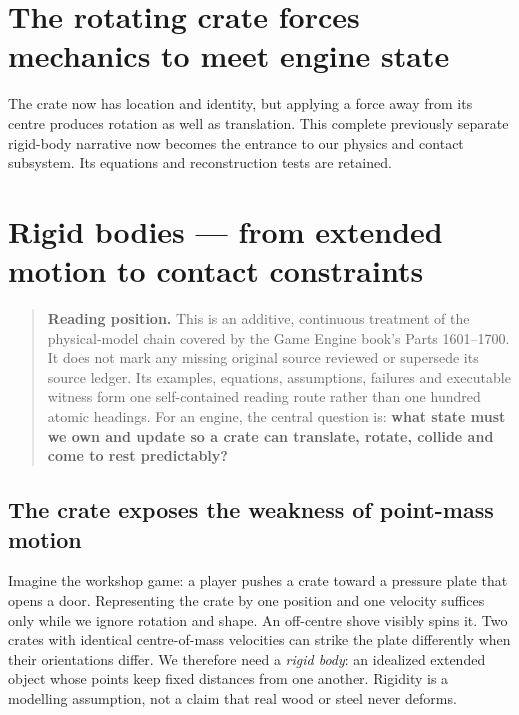\section{The rotating crate forces mechanics to meet engine state}\label{06-engine-ii-ch033-the-rotating-crate-forces-mechanics-to-meet-engine-state}

\hypertarget{06-engine-ii-ch033-the-rotating-crate-forces-mechanics-to-meet-engine-state}{}

The crate now has location and identity, but applying a force away from its centre produces rotation as well as translation. This complete previously separate rigid-body narrative now becomes the entrance to our physics and contact subsystem. Its equations and reconstruction tests are retained.

\section{Rigid bodies --- from extended motion to contact constraints}\label{06-engine-ii-ch033-rigid-bodies-from-extended-motion-to-contact-constraints}

\hypertarget{06-engine-ii-ch033-rigid-bodies-from-extended-motion-to-contact-constraints}{}

\begin{quote}
\textbf{Reading position.} This is an additive, continuous treatment of the physical-model chain covered by the Game Engine book's Parts 1601--1700. It does not mark any missing original source reviewed or supersede its source ledger. Its examples, equations, assumptions, failures and executable witness form one self-contained reading route rather than one hundred atomic headings. For an engine, the central question is: \textbf{what state must we own and update so a crate can translate, rotate, collide and come to rest predictably?}
\end{quote}

\subsection{The crate exposes the weakness of point-mass motion}\label{06-engine-ii-ch033-the-crate-exposes-the-weakness-of-point-mass-motion}

\hypertarget{06-engine-ii-ch033-the-crate-exposes-the-weakness-of-point-mass-motion}{}

Imagine the workshop game: a player pushes a crate toward a pressure plate that opens a door. Representing the crate by one position and one velocity suffices only while we ignore rotation and shape. An off-centre shove visibly spins it. Two crates with identical centre-of-mass velocities can strike the plate differently when their orientations differ. We therefore need a \emph{rigid body}: an idealized extended object whose points keep fixed distances from one another. Rigidity is a modelling assumption, not a claim that real wood or steel never deforms.

